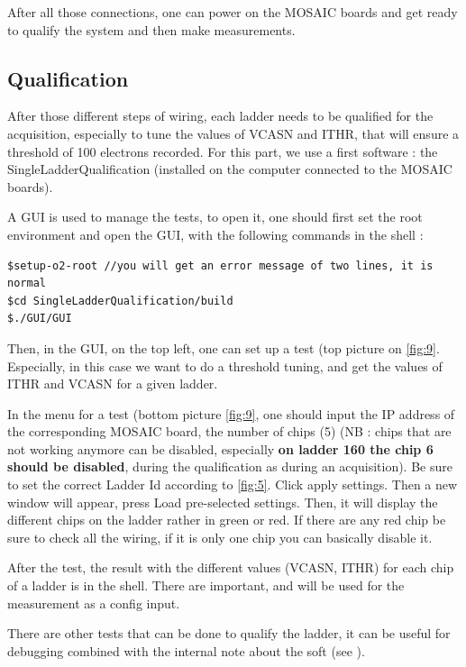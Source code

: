 \documentclass[12pt,oneside,a4]{article}
\begin{document}
After all those connections, one can power on the MOSAIC boards and get ready to qualify the system and then make measurements.

\subsection{Qualification}\label{Qualification}
After those different steps of wiring,  each ladder needs to be qualified for the acquisition, especially to tune the values of VCASN and ITHR, that will ensure a threshold of 100 electrons recorded. For this part, we use a first software : the SingleLadderQualification \cite{SingleLadderQualification} (installed on the computer connected to the MOSAIC boards).

A GUI is used to manage the tests, to open it, one should first set the root environment and open the GUI, with the following commands in the shell :

\begin{verbatim}
$setup-o2-root //you will get an error message of two lines, it is normal
$cd SingleLadderQualification/build
$./GUI/GUI
\end{verbatim}


Then, in the GUI, on the top left, one can set up a test (top picture on \ref{fig:9}. Especially, in this case we want to do a threshold tuning, and get the values of ITHR and VCASN for a given ladder.

In the menu for a test (bottom picture \ref{fig:9}, one should input the IP address of the corresponding MOSAIC board,  the number of chips (5) (NB : chips that are not working anymore can be disabled, especially \textbf{on ladder 160 the chip 6 should be disabled}, during the qualification as during an acquisition). Be sure to set the correct Ladder Id according to \ref{fig:5}. Click apply settings. Then a new window will appear, press Load pre-selected settings. 
Then, it will display the different chips on the ladder rather in green or red. If there are any red chip be sure to check all the wiring, if it is only one chip you can basically disable it. 

After the test, the result with the different values (VCASN, ITHR) for each chip of a ladder is in the shell. There are important, and will be used for the measurement as a config input.

There are other tests that can be done to qualify the ladder, it can be useful for debugging combined with the internal note about the soft (see \cite{Note}).
\end{document}
